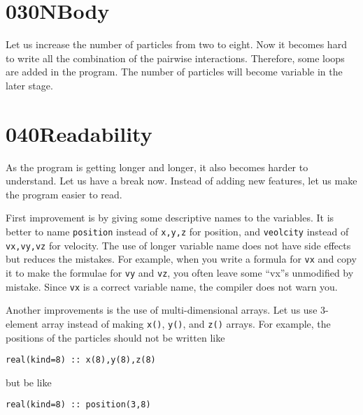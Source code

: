 \documentclass[a4,10pt]{article}
\begin{document}
\section{030NBody}

Let us increase the number of particles from two to eight.
Now it becomes hard to write all the combination of the pairwise interactions.
Therefore, some loops are added in the program.
The number of particles will become variable in the later stage.


\section{040Readability}

As the program is getting longer and longer, it also becomes harder to understand.
Let us have a break now.  Instead of adding new features, let us make the program easier to read.

First improvement is by giving  some descriptive names to the variables.
It is better to name {\tt position} instead of {\tt x,y,z} for position, and {\tt veolcity} instead of {\tt vx,vy,vz} for velocity.
The use of longer variable name does not have side effects but reduces the mistakes.
For example, when you write a formula for {\tt vx} and copy it to make the formulae for {\tt vy} and {\tt vz}, you often leave some ``vx''s unmodified by mistake.  Since {\tt vx} is a correct variable name, the compiler does not warn you.

Another improvements is the use of multi-dimensional arrays.  Let us use 3-element array instead of making {\tt x()}, {\tt y()}, and {\tt z()} arrays.  For example, the positions of the particles should not be written like
\begin{screen}\begin{verbatim}
real(kind=8) :: x(8),y(8),z(8)
\end{verbatim}\end{screen}
but be like
\begin{screen}\begin{verbatim}
real(kind=8) :: position(3,8)
\end{verbatim}\end{screen}
\end{document}
